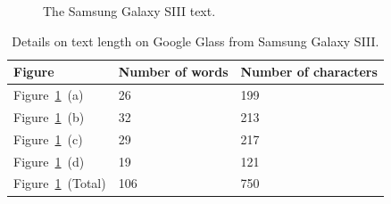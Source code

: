 	\begin{figure}[H]%
		\centering
   		 \qquad
   		 \qquad
   		 \qquad
   		 \qquad
		\caption{The Samsung Galaxy SIII text.}
		\label{glassTestTextLengthS3Text}
	\end{figure}

	\begin{table}[ht!]
    		\caption{Details on text length on Google Glass from Samsung Galaxy SIII.} \label{tab:glassTestTextLengthS3TextTable}
		\centering \begin{tabularx}{\textwidth}{l|X|X} \hline
		\textbf{Figure} & \textbf{Number of words} & \textbf{Number of characters} \\ \hline \hline
       
		Figure~\ref{glassTestTextLengthS3Text}~(a)	&26	&199	\\ \hline
		Figure~\ref{glassTestTextLengthS3Text}~(b)	&32	&213	\\ \hline
		Figure~\ref{glassTestTextLengthS3Text}~(c)	&29	&217	\\ \hline
		Figure~\ref{glassTestTextLengthS3Text}~(d)	&19	&121	\\ \hline
		Figure~\ref{glassTestTextLengthS3Text}~(Total)	&106	&750	\\ \hline
		
		\end{tabularx}
	\end{table}

